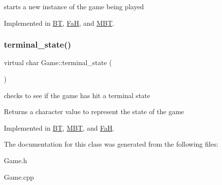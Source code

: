 starts a new instance of the game being played 



Implemented in \hyperlink{class_b_t_acb87d577e00a5fa66ddb653c697e3ad4}{BT}, \hyperlink{class_fa_h_a21c22430a8fa6d3654cb29244d04d0ab}{FaH}, and \hyperlink{class_m_b_t_aa951382dfec95e214ba1e63189977d8f}{M\+BT}.

\mbox{\label{class_game_ac7cbe36964272dd7dcd7e68fafaf24cc}} 
\subsubsection{\texorpdfstring{terminal\+\_\+state()}{terminal\_state()}}
{\footnotesize\ttfamily virtual char Game\+::terminal\+\_\+state (\begin{DoxyParamCaption}{ }\end{DoxyParamCaption})\hspace{0.3cm}{\ttfamily [pure virtual]}}



checks to see if the game has hit a terminal state 

\begin{DoxyReturn}{Returns}
a character value to represent the state of the game 
\end{DoxyReturn}


Implemented in \hyperlink{class_b_t_a5b09c0eb2d583ae2141aeefe18545e5c}{BT}, \hyperlink{class_m_b_t_ac0b5fc7a538c643ce69a678407fa9f56}{M\+BT}, and \hyperlink{class_fa_h_a575223df37dc4b747634a7873e399275}{FaH}.



The documentation for this class was generated from the following files\+:\begin{DoxyCompactItemize}
\item 
Game.\+h\item 
Game.\+cpp\end{DoxyCompactItemize}

